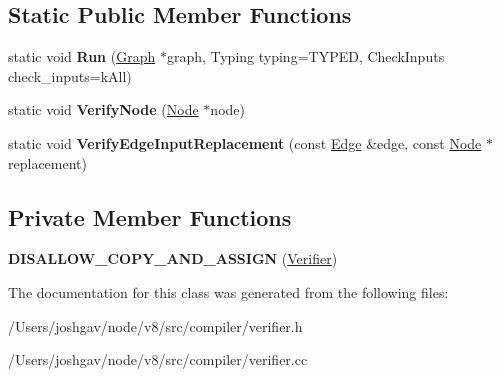 \subsection*{Static Public Member Functions}
\begin{DoxyCompactItemize}
\item 
static void {\bfseries Run} (\hyperlink{classv8_1_1internal_1_1compiler_1_1_graph}{Graph} $\ast$graph, Typing typing=T\+Y\+P\+ED, Check\+Inputs check\+\_\+inputs=k\+All)\hypertarget{classv8_1_1internal_1_1compiler_1_1_verifier_a2bf2e4ffb0bdfe11dc11afa7171026e8}{}\label{classv8_1_1internal_1_1compiler_1_1_verifier_a2bf2e4ffb0bdfe11dc11afa7171026e8}

\item 
static void {\bfseries Verify\+Node} (\hyperlink{classv8_1_1internal_1_1compiler_1_1_node}{Node} $\ast$node)\hypertarget{classv8_1_1internal_1_1compiler_1_1_verifier_ad4ccd74b2c1820f3e00a863eb4d73515}{}\label{classv8_1_1internal_1_1compiler_1_1_verifier_ad4ccd74b2c1820f3e00a863eb4d73515}

\item 
static void {\bfseries Verify\+Edge\+Input\+Replacement} (const \hyperlink{classv8_1_1internal_1_1compiler_1_1_edge}{Edge} \&edge, const \hyperlink{classv8_1_1internal_1_1compiler_1_1_node}{Node} $\ast$replacement)\hypertarget{classv8_1_1internal_1_1compiler_1_1_verifier_ab262c42f5331cbb6e489e73b310dac31}{}\label{classv8_1_1internal_1_1compiler_1_1_verifier_ab262c42f5331cbb6e489e73b310dac31}

\end{DoxyCompactItemize}
\subsection*{Private Member Functions}
\begin{DoxyCompactItemize}
\item 
{\bfseries D\+I\+S\+A\+L\+L\+O\+W\+\_\+\+C\+O\+P\+Y\+\_\+\+A\+N\+D\+\_\+\+A\+S\+S\+I\+GN} (\hyperlink{classv8_1_1internal_1_1compiler_1_1_verifier}{Verifier})\hypertarget{classv8_1_1internal_1_1compiler_1_1_verifier_afd27482d30f40b11e89e13ff66e2ddf6}{}\label{classv8_1_1internal_1_1compiler_1_1_verifier_afd27482d30f40b11e89e13ff66e2ddf6}

\end{DoxyCompactItemize}


The documentation for this class was generated from the following files\+:\begin{DoxyCompactItemize}
\item 
/\+Users/joshgav/node/v8/src/compiler/verifier.\+h\item 
/\+Users/joshgav/node/v8/src/compiler/verifier.\+cc\end{DoxyCompactItemize}
